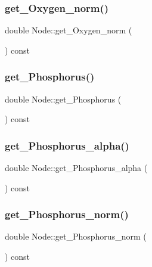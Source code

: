 \mbox{\label{class_node_aebcd3bc20e59393353b437f7f870b0e4}} 
\subsubsection{\texorpdfstring{get\_Oxygen\_norm()}{get\_Oxygen\_norm()}}
{\footnotesize\ttfamily double Node\+::get\+\_\+\+Oxygen\+\_\+norm (\begin{DoxyParamCaption}{ }\end{DoxyParamCaption}) const}

\mbox{\label{class_node_a16934c9bbdb08bb051d0bf191b2b707c}} 
\subsubsection{\texorpdfstring{get\_Phosphorus()}{get\_Phosphorus()}}
{\footnotesize\ttfamily double Node\+::get\+\_\+\+Phosphorus (\begin{DoxyParamCaption}{ }\end{DoxyParamCaption}) const}

\mbox{\label{class_node_a1a77dc13290f5876e2f948a3ad85af62}} 
\subsubsection{\texorpdfstring{get\_Phosphorus\_alpha()}{get\_Phosphorus\_alpha()}}
{\footnotesize\ttfamily double Node\+::get\+\_\+\+Phosphorus\+\_\+alpha (\begin{DoxyParamCaption}{ }\end{DoxyParamCaption}) const}

\mbox{\label{class_node_ab0495b500c8b58d160e979e35e9f7df6}} 
\subsubsection{\texorpdfstring{get\_Phosphorus\_norm()}{get\_Phosphorus\_norm()}}
{\footnotesize\ttfamily double Node\+::get\+\_\+\+Phosphorus\+\_\+norm (\begin{DoxyParamCaption}{ }\end{DoxyParamCaption}) const}

